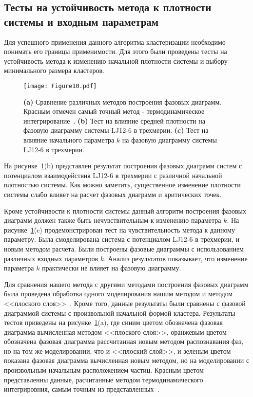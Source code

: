 \subsection{Тесты на устойчивость метода к плотности системы и входным параметрам}
\label{PRIMe-SubSecTests}


Для успешного применения данного алгоритма кластеризации необходимо понимать его границы применимости.
Для этого были проведены тесты на устойчивость метода к изменению начальной плотности системы и выбору минимального размера кластеров.

\begin{figure}[!t]
    \centering
    \texttt{[image: Figure10.pdf]}
    \caption{\textbf{(a)} Сравнение различных методов построения фазовых диаграмм. Красным отмечен самый точный метод - термодинамическое интегрирование~\cite{10.1080/00268976.2019.1699185}.
             \textbf{(b)} Тест на влияние средней плотности на фазовую диаграмму системы LJ12-6 в трехмерии.
             \textbf{(c)} Тест на влияние начального параметра $k$ на фазовую диаграмму системы LJ12-6 в трехмерии.}
    \label{tests}
\end{figure}



На рисунке~\ref{tests}(b) представлен результат построения фазовых диаграмм систем с потенциалом взаимодействия LJ12-6 в трехмерии с различной начальной плотностью системы. Как можно заметить, существенное изменение плотности системы слабо влияет на расчет фазовых диаграмм и критических точек.



Кроме устойчивости к плотности системы данный алгоритм построения фазовых диаграмм должен также быть нечувствительным к изменению параметра $k$.
На рисунке~\ref{tests}(c) продемонстрирован тест на чувствительность метода к данному параметру.
Была смоделирована система с потенциалом LJ12-6 в трехмерии, и новым методом расчета.
Были построены фазовые диаграммы с использованием различных входных параметров $k$.
Анализ результатов показывает, что изменение параметра $k$ практически не влияет на фазовую диаграмму.



Для сравнения нашего метода с другими методами построения фазовых диаграмм была проведена обработка одного моделирования нашим методом и методом <<плоского слоя>>~\cite{10.1021/jp806127j, 10.1021/jp1117213}.
Кроме того, данные результаты были сравнены с фазовой диаграммой системы с произвольной начальной формой кластера.
Результаты тестов приведены на рисунке~\ref{tests}(a), где синим цветом обозначена фазовая диаграмма вычисленная методом <<плоского слоя>>, оранжевым цветом обозначена фазовая диаграмма рассчитанная новым методом распознавания фаз, но на том же моделировании, что и <<плоский слой>>, и зеленым цветом показана фазовая диаграмма вычисленная новым методом, но на моделировании с произвольным начальным расположением частиц. Красным цветом представленны данные, расчитанные методом термодинамического интегрировния, самым точным из представленных~\cite{10.1080/00268976.2019.1699185}.


